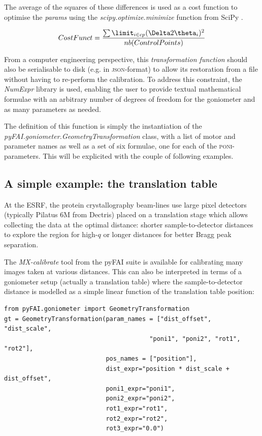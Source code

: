 \documentclass[preprint]{iucr}              %
\begin{document}
The average of the squares of these differences is used as a cost function
to optimise the \textit{params} using the \textit{scipy.optimize.minimize}
function from SciPy \cite{scipy}.

$$
CostFunct = \frac{ \sum\limit_{i \in cp} {(\Delta 2\theta_i)^2}}
{nb(ControlPoints)} $$

From a computer engineering perspective, this \textit{transformation function}
should also be serialisable to disk (e.g. in \textsc{json}-format) to allow
its restoration from a file without having to re-perform the calibration. 
To address this constraint, the \textit{NumExpr} library \cite{numexpr} is
used, enabling the user to provide textual mathematical formulae with
an arbitrary number of degrees of freedom for the goniometer and as many parameters
as needed.

The definition of this function is simply the instantiation of the
\textit{pyFAI.goniometer.GeometryTransformation} class, with a list of
motor and parameter names as well as a set of six formulae, one for each of
the \textsc{poni}-parameters.
This will be explicited with the couple of following examples.

\subsection{A simple example: the translation table}

At the  ESRF, the protein crystallography beam-lines use large pixel detectors
(typically Pilatus 6M from Dectris) placed on a translation stage which allows
collecting the data at the optimal distance: shorter sample-to-detector
distances to explore the region for high-$q$ 
or longer distances for better Bragg peak separation. 

The \textit{MX-calibrate} tool from the pyFAI suite is available for
calibrating many images taken at various distances.
This can also be interpreted in terms of a goniometer setup (actually a translation table) where the sample-to-detector distance is modelled as a
simple linear function of the translation table position:

\begin{verbatim}
from pyFAI.goniometer import GeometryTransformation
gt = GeometryTransformation(param_names = ["dist_offset", "dist_scale", 
                                        "poni1", "poni2", "rot1", "rot2"],
                            pos_names = ["position"],
                            dist_expr="position * dist_scale + dist_offset", 
                            poni1_expr="poni1",
                            poni2_expr="poni2", 
                            rot1_expr="rot1", 
                            rot2_expr="rot2", 
                            rot3_expr="0.0")
\end{verbatim}
 
\end{document}
